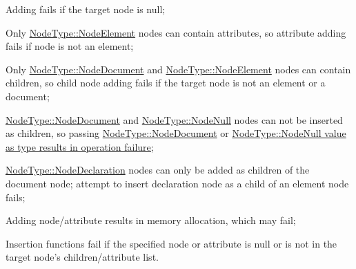 \begin{DoxyItemize}
\item Adding fails if the target node is null;
\item Only \hyperlink{namespaceMezzanine_1_1xml_a524d867e34ff408b8f45a51b7924cb80}{NodeType::NodeElement} nodes can contain attributes, so attribute adding fails if node is not an element;
\item Only \hyperlink{namespaceMezzanine_1_1xml_a524d867e34ff408b8f45a51b7924cb80}{NodeType::NodeDocument} and \hyperlink{namespaceMezzanine_1_1xml_a524d867e34ff408b8f45a51b7924cb80}{NodeType::NodeElement} nodes can contain children, so child node adding fails if the target node is not an element or a document;
\item \hyperlink{namespaceMezzanine_1_1xml_a524d867e34ff408b8f45a51b7924cb80}{NodeType::NodeDocument} and \hyperlink{namespaceMezzanine_1_1xml_a524d867e34ff408b8f45a51b7924cb80}{NodeType::NodeNull} nodes can not be inserted as children, so passing \hyperlink{namespaceMezzanine_1_1xml_a524d867e34ff408b8f45a51b7924cb80}{NodeType::NodeDocument} or \hyperlink{namespaceMezzanine_1_1xml_a524d867e34ff408b8f45a51b7924cb80}{NodeType::NodeNull value as type results in operation failure;}
\item \hyperlink{namespaceMezzanine_1_1xml_a524d867e34ff408b8f45a51b7924cb80}{NodeType::NodeDeclaration} nodes can only be added as children of the document node; attempt to insert declaration node as a child of an element node fails;
\item Adding node/attribute results in memory allocation, which may fail;
\item Insertion functions fail if the specified node or attribute is null or is not in the target node's children/attribute list.
\end{DoxyItemize}

